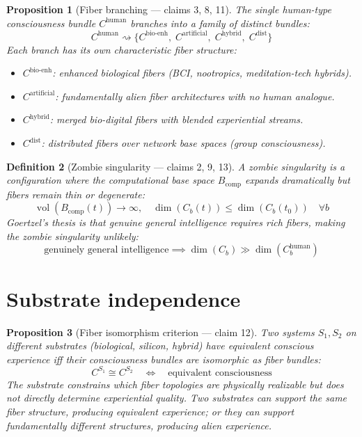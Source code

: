 \documentclass[11pt,a4paper]{article}
\newtheorem{definition}{Definition}[section]
\newtheorem{proposition}[definition]{Proposition}
\begin{document}
\begin{proposition}[Fiber branching --- claims 3, 8, 11]
\label{prop:branching}
The single human-type consciousness bundle $C^{\text{human}}$ branches
into a family of distinct bundles:
\[
  C^{\text{human}} \rightsquigarrow \{C^{\text{bio-enh}},\;
    C^{\text{artificial}},\; C^{\text{hybrid}},\; C^{\text{dist}}\}
\]
Each branch has its own characteristic fiber structure:
\begin{itemize}
  \item $C^{\text{bio-enh}}$: enhanced biological fibers (BCI, nootropics,
    meditation-tech hybrids).
  \item $C^{\text{artificial}}$: fundamentally alien fiber architectures
    with no human analogue.
  \item $C^{\text{hybrid}}$: merged bio-digital fibers with blended
    experiential streams.
  \item $C^{\text{dist}}$: distributed fibers over network base spaces
    (group consciousness).
\end{itemize}
\end{proposition}

\begin{definition}[Zombie singularity --- claims 2, 9, 13]
A \emph{zombie singularity} is a configuration where the computational
base space $B_{\text{comp}}$ expands dramatically but fibers remain
thin or degenerate:
\[
  \operatorname{vol}(B_{\text{comp}}(t)) \to \infty, \quad
  \dim(C_b(t)) \leq \dim(C_b(t_0)) \quad \forall b
\]
Goertzel's thesis is that genuine general intelligence requires rich
fibers, making the zombie singularity unlikely:
\[
  \text{genuinely general intelligence} \implies
  \dim(C_b) \gg \dim(C_b^{\text{human}})
\]
\end{definition}

\section{Substrate independence}

\begin{proposition}[Fiber isomorphism criterion --- claim 12]
\label{prop:substrate}
Two systems $S_1, S_2$ on different substrates (biological, silicon, hybrid)
have equivalent conscious experience iff their consciousness bundles are
isomorphic as fiber bundles:
\[
  C^{S_1} \cong C^{S_2} \quad \iff \quad
  \text{equivalent consciousness}
\]
The substrate constrains which fiber topologies are physically realizable
but does not directly determine experiential quality. Two substrates can
support the same fiber structure, producing equivalent experience; or they
can support fundamentally different structures, producing alien experience.
\end{proposition}
\end{document}
